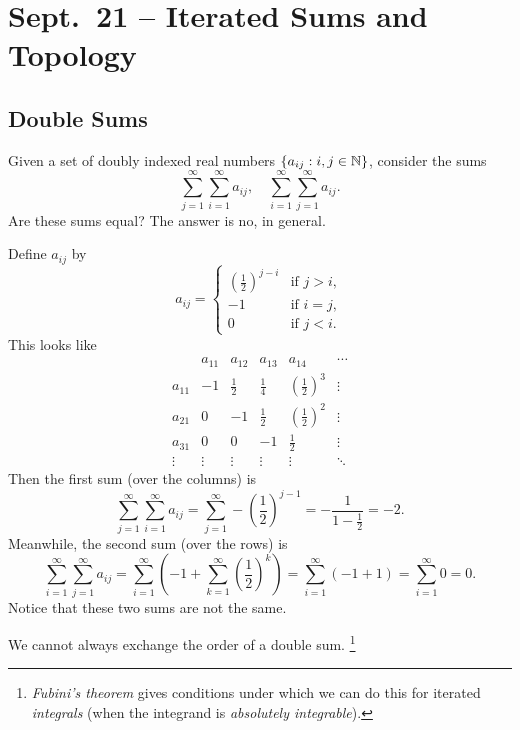 \chapter{Sept.~21 -- Iterated Sums and Topology}

\section{Double Sums}
Given a set of doubly indexed real numbers
$\{a_{ij} : i, j \in \mathbb{N}\}$, consider the
sums
\[
  \sum_{j = 1}^\infty \sum_{i = 1}^\infty a_{ij}, \quad
  \sum_{i = 1}^\infty \sum_{j = 1}^\infty a_{ij}.
\]
Are these sums equal? The answer is no, in general.

\begin{example}
  Define $a_{ij}$ by
  \[
    a_{ij} = \begin{cases}
      \left(\frac{1}{2}\right)^{j - i} & \text{if $j > i$}, \\
      -1 & \text{if $i = j$}, \\
      0 & \text{if $j < i$}.
    \end{cases}
  \]
  This looks like
  \[
    \begin{array}{c|ccccc}
      & a_{11} & a_{12} & a_{13} & a_{14} & \cdots \\
      \hline
      a_{11} & -1 & \frac{1}{2} & \frac{1}{4} & \left(\frac{1}{2}\right)^3 & \vdots \\
      a_{21} & 0 & -1 & \frac{1}{2} & \left(\frac{1}{2}\right)^2 & \vdots \\
      a_{31} & 0 & 0 & -1 & \frac{1}{2} & \vdots \\
      \vdots & \vdots & \vdots & \vdots & \vdots & \ddots
    \end{array}
  \]
  Then the first sum (over the columns) is
  \[
    \sum_{j = 1}^\infty \sum_{i = 1}^\infty a_{ij}
    = \sum_{j = 1}^\infty -\left(\frac{1}{2}\right)^{j - 1}
    = -\frac{1}{1 - \frac{1}{2}} = -2
  .\]
  Meanwhile, the second sum (over the rows) is
  \[
    \sum_{i = 1}^\infty \sum_{j = 1}^\infty a_{ij}
    = \sum_{i = 1}^\infty \left(-1 + \sum_{k = 1}^\infty \left(\frac{1}{2}\right)^{k}\right)
    = \sum_{i = 1}^\infty \left(-1 + 1\right)
    = \sum_{i = 1}^\infty 0 = 0
  .\]
  Notice that these two sums are not the same.
\end{example}

\begin{remark}
  We cannot always exchange the order of a double
  sum.
  \footnote{\textit{Fubini's theorem} gives conditions under which we can do this for iterated \textit{integrals} (when the integrand is \textit{absolutely integrable}).}
\end{remark}

